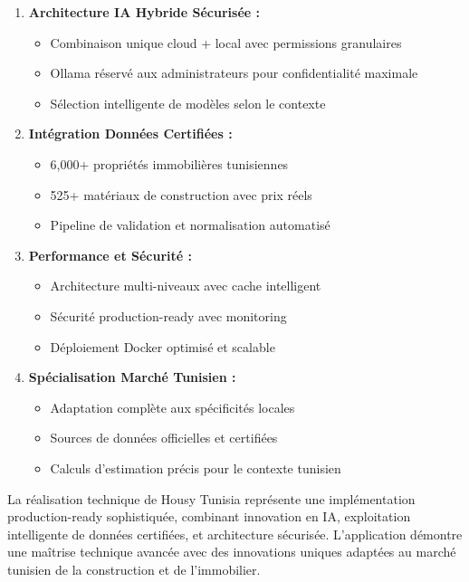 \begin{enumerate}
    \item \textbf{Architecture IA Hybride Sécurisée :} 
    \begin{itemize}
        \item Combinaison unique cloud + local avec permissions granulaires
        \item Ollama réservé aux administrateurs pour confidentialité maximale
        \item Sélection intelligente de modèles selon le contexte
    \end{itemize}
    
    \item \textbf{Intégration Données Certifiées :}
    \begin{itemize}
        \item 6,000+ propriétés immobilières tunisiennes
        \item 525+ matériaux de construction avec prix réels
        \item Pipeline de validation et normalisation automatisé
    \end{itemize}
    
    \item \textbf{Performance et Sécurité :}
    \begin{itemize}
        \item Architecture multi-niveaux avec cache intelligent
        \item Sécurité production-ready avec monitoring
        \item Déploiement Docker optimisé et scalable
    \end{itemize}
    
    \item \textbf{Spécialisation Marché Tunisien :}
    \begin{itemize}
        \item Adaptation complète aux spécificités locales
        \item Sources de données officielles et certifiées
        \item Calculs d'estimation précis pour le contexte tunisien
    \end{itemize}
\end{enumerate}

\begin{resultbox}
La réalisation technique de Housy Tunisia représente une implémentation production-ready sophistiquée, combinant innovation en IA, exploitation intelligente de données certifiées, et architecture sécurisée. L'application démontre une maîtrise technique avancée avec des innovations uniques adaptées au marché tunisien de la construction et de l'immobilier.
\end{resultbox}

